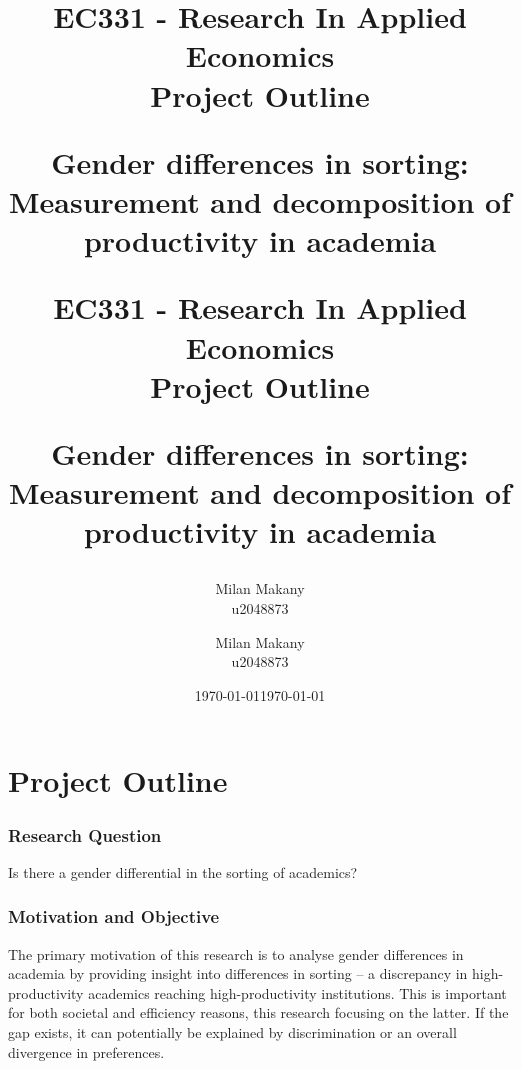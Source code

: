 \documentclass[10pt]{report}
\begin{document}
\title{EC331 - Research In Applied Economics \\ 
Project Outline
\vspace{150pt}

{Gender differences in sorting: Measurement and decomposition of productivity in academia} \\

\vspace{150pt}
}
\author{Milan Makany \\
u2048873}
\date{\today}

\title{EC331 - Research In Applied Economics \\ 
Project Outline
\vspace{150pt}

{Gender differences in sorting: Measurement and decomposition of productivity in academia} \\

\vspace{150pt}
}
\author{Milan Makany \\
u2048873}
\date{\today}

\maketitle

\justify 
\section*{Project Outline}

\subsubsection*{Research Question}

Is there a gender differential in the sorting of academics?

\subsubsection*{Motivation and Objective}
The primary motivation of this research is to analyse gender differences in academia by providing insight into differences in sorting -- a discrepancy in high-productivity academics reaching high-productivity institutions. This is important for both societal and efficiency reasons, this research focusing on the latter. If the gap exists, it can potentially be explained by discrimination or an overall divergence in preferences.

\end{document}
